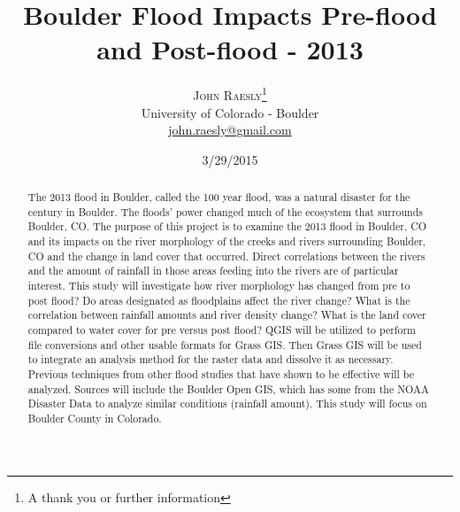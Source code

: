 \documentclass[twoside]{article}
\title{\vspace{-15mm}\fontsize{24pt}{10pt}\selectfont\textbf{Boulder Flood Impacts Pre-flood and Post-flood - 2013}} %
\author{
\large
\textsc{John Raesly}\thanks{A thank you or further information}\\[2mm] %
\normalsize University of Colorado - Boulder \\ %
\normalsize \href{mailto:john.raesly@gmail.com}{john.raesly@gmail.com} %
\vspace{-3mm}
}
\date{3/29/2015}
\begin{document}
\maketitle %

\thispagestyle{fancy} %


\begin{abstract}

The 2013 flood in Boulder, called the 100 year flood, was a natural disaster for the century in Boulder. The floods' power changed much of the ecosystem that surrounds Boulder, CO. The purpose of this project is to examine the 2013 flood in Boulder, CO and its impacts on the river morphology of the creeks and rivers surrounding Boulder, CO and the change in land cover that occurred. Direct correlations between the rivers and the amount of rainfall in those areas feeding into the rivers are of particular interest. This study will investigate how river morphology has changed from pre to post flood? Do areas designated as floodplains affect the river change? What is the correlation between rainfall amounts and river density change? What is the land cover compared to water cover for pre versus post flood? QGIS will be utilized to perform file conversions and other usable formats for Grass GIS. Then Grass GIS will be used to integrate an analysis method for the raster data and dissolve it as necessary. Previous techniques from other flood studies that have shown to be effective will be analyzed. Sources will include the Boulder Open GIS, which has some from the NOAA Disaster Data to analyze similar conditions (rainfall amount). This study will focus on Boulder County in Colorado. 

\end{abstract}

\end{document}
